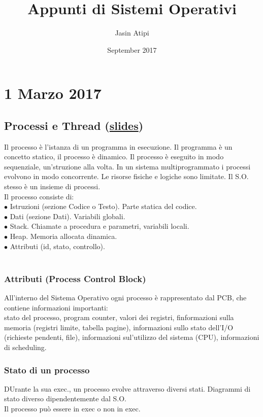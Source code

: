 \documentclass{article}
\title{Appunti di Sistemi Operativi}
\author{Jasin Atipi}
\date{September 2017}
\begin{document}
\maketitle

\section*{1 Marzo 2017}
\subsection*{Processi e Thread (\href{https://didatticaonline.unitn.it/dol/pluginfile.php/368856/mod_resource/content/1/05-Processi_e_Thread.pdf}{slides})}
Il processo \`{e} l'istanza di un programma in esecuzione. Il programma \`{e} un concetto statico, il processo \`{e} dinamico. Il processo \`{e} eseguito in modo sequenziale, un'struzione alla volta. In un sistema multiprogrammato i processi evolvono in modo concorrente. Le risorse fisiche e logiche sono limitate. Il S.O. stesso \`{e} un insieme di processi.\\
Il processo consiste di:\\
$\bullet$ Istruzioni (sezione Codice o Testo). Parte statica del codice.\\
$\bullet$ Dati (sezione Dati). Variabili globali.\\
$\bullet$ Stack. Chiamate a procedura e parametri, variabili locali.\\
$\bullet$ Heap. Memoria allocata dinamica.\\
$\bullet$ Attributi (id, stato, controllo).\\
\\
\subsubsection*{Attributi (Process Control Block)}
All'interno del Sistema Operativo ogni processo \`{e} rappresentato dal PCB, che contiene informazioni importanti:\\
stato del processo, program counter, valori dei registri, finformazioni sulla memoria (registri limite, tabella pagine), informazioni sullo stato dell'I/O (richieste pendenti, file), informazioni sul'utilizzo del sistema (CPU), informazioni di scheduling.\\
\subsubsection*{Stato di un processo}
DUrante la sua exec., un processo evolve attraverso diversi stati. Diagrammi di stato diverso dipendentemente dal S.O.\\
Il processo pu\`{o} essere in exec o non in exec.\\
\end{document}

